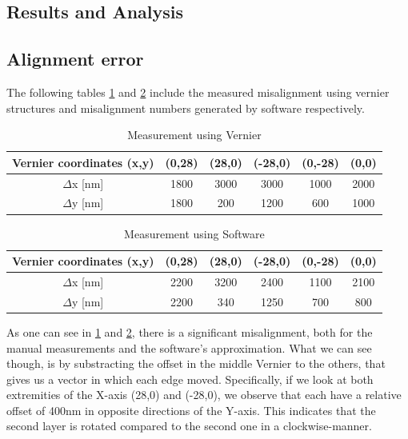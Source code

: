 \documentclass[a4paper, table]{article}
\begin{document}
\pagebreak
\subsection{Results and Analysis}
\subsection*{Alignment error}
The following tables \ref{table: Vernier} and \ref{table:software} include the measured misalignment using vernier structures and misalignment numbers generated by software respectively.
\begin{table}[ht]
    \centering
    \caption{Measurement using Vernier}
    \begin{tabular}[t]{|c|c|c|c|c|c|}
        \toprule
         \color{Tue-red}\textbf{Vernier coordinates (x,y) }&\color{Tue-red}\textbf{(0,28)}&\color{Tue-red}\textbf{(28,0)}&\color{Tue-red}\textbf{(-28,0)}&\color{Tue-red}\textbf{(0,-28)} & \color{Tue-red}\textbf{(0,0)}\\
        \midrule
        $\Delta$x [nm]&1800&3000&3000&1000& 2000\\
        $\Delta$y [nm]&1800&200&1200&600& 1000\\
        \bottomrule
    \end{tabular}
    \label{table: Vernier}
\end{table}
\begin{table}[ht]
    \centering
    \caption{Measurement using Software}
    \begin{tabular}[t]{|c|c|c|c|c|c|}
        \toprule
         \color{Tue-red}\textbf{Vernier coordinates (x,y) }&\color{Tue-red}\textbf{(0,28)}&\color{Tue-red}\textbf{(28,0)}&\color{Tue-red}\textbf{(-28,0)}&\color{Tue-red}\textbf{(0,-28)} & \color{Tue-red}\textbf{(0,0)}\\
        \midrule
        $\Delta$x [nm]&2200&3200&2400&1100& 2100\\
        $\Delta$y [nm]&2200&340&1250&700& 800\\
        \bottomrule
    \end{tabular}
    \label{table:software}
\end{table}

As one can see in \cref{table: Vernier} and \cref{table:software}, there is a significant misalignment, both for the manual measurements and the software's approximation.
What we can see though, is by substracting the offset in the middle Vernier to the others, that gives us a vector in which each edge moved. Specifically, if we look at both extremities of the X-axis (28,0) and (-28,0), we observe that each have a relative offset of 400nm in opposite directions of the Y-axis. This indicates that the second layer is rotated compared to the second one in a clockwise-manner.
\end{document}
